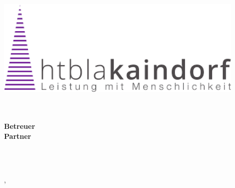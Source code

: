 
\begin{titlepage}

{\sffamily

\begin{center}

\includegraphics[width=120mm]{figures/KaindorfLogo}

\vspace{15pt}

{\LARGE\bfseries\mytitle}

{\bfseries\large\myworktitle}\\
\vspace{8pt}
\myauthorwithexistingtitles\\
\vspace{15pt}
\textbf{Betreuer}
\mysupervisor
\\
\vspace{15pt}
\textbf{Partner}
\mypartner

\vspace{50pt}

\myinstitute\\

\




\mysubmissiontown, \mysubmissionmonth~\mysubmissionyear

\end{center}
}%
\end{titlepage}

\newpage

